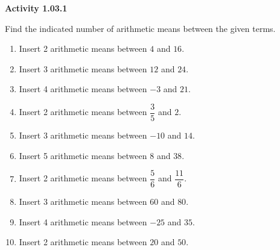 \vspace{0.3ex}
\noindent\textbf{Activity 1.03.1}

\vspace{0.2ex}

Find the indicated number of arithmetic means between the given terms.
\begin{enumerate}
    \item Insert 2 arithmetic means between $4$ and $16$.
    \item Insert 3 arithmetic means between $12$ and $24$.
    \item Insert 4 arithmetic means between $-3$ and $21$.
    \item Insert 2 arithmetic means between $\dfrac{3}{5}$ and $2$.
    \item Insert 3 arithmetic means between $-10$ and $14$.
    \item Insert 5 arithmetic means between $8$ and $38$.
    \item Insert 2 arithmetic means between $\dfrac{5}{6}$ and $\dfrac{11}{6}$.
    \item Insert 3 arithmetic means between $60$ and $80$.
    \item Insert 4 arithmetic means between $-25$ and $35$.
    \item Insert 2 arithmetic means between $20$ and $50$.
\end{enumerate}